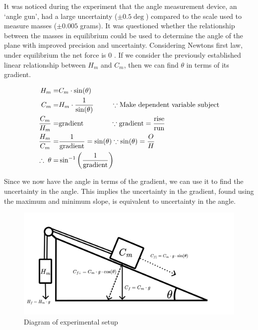 \documentclass[11pt,a4paper]{article}
\begin{document}
It was noticed during the experiment that the angle measurement device, an `angle gun', had a large uncertainty ($\pm0.5\deg$) compared to the scale used to measure masses ($\pm0.005$ grams). It was questioned whether the relationship between the masses in equilibrium could be used to determine the angle of the plane with improved precision and uncertainty. 
\newline
\newline
Considering Newtons first law, under equilibrium the net force is 0 \cite{encyclopediabritannica_2023_newtons}. If we consider the previously established linear relationship between $H_m$ and $C_m$, then we can find $\theta$ in terms of its gradient.
\begin{center}
	\begin{align*}
	H_m= &C_m\cdot{\sin(\theta)} \\
	C_m= &H_m\cdot\frac{1}{{\sin(\theta)}}\;\;\;\; \;\;\;\;\;\because \textrm{Make dependent variable subject} \\
	\frac{C_m}{H_m}=&\textrm{gradient}	\;\;\;\;\;\;\;\;\;\;\;\;\;\;\because \textrm{gradient}=\frac{\textrm{rise}}{\textrm{run}}\\
\linebreak
	\frac{H_m}{C_m}=&\frac{1}{\mathrm{gradient}}=\sin(\theta) \because \sin(\theta)=\frac{O}{H}\\
	\therefore  \;\theta=&\sin^{-1}\left(\frac{1}{\textrm{gradient}}\right)
	\end{align*}
\end{center}



Since we now have the angle in terms of the gradient, we can use it to find the uncertainty in the angle. 
This implies the uncertainty in the gradient, found using the maximum and minimum slope, is equivalent to uncertainty in the angle. 
\begin{figure}[]
	\centering
	\includegraphics[width=0.5\paperwidth]{./Diagrams/set_upV2.png}
	\caption{Diagram of experimental setup}
\end{figure}
\end{document}
